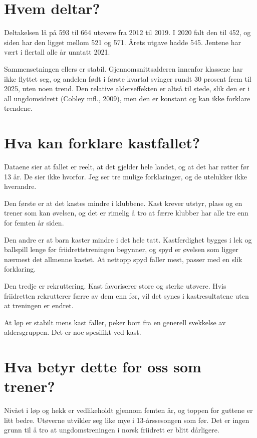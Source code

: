 \section{Hvem deltar?}\label{hvem-deltar}

Deltakelsen lå på 593 til 664 utøvere fra 2012 til 2019. I 2020 falt den til 452, og siden har den ligget mellom 521 og 571. Årets utgave hadde 545. Jentene har vært i flertall alle år unntatt 2021.

Sammensetningen ellers er stabil. Gjennomsnittsalderen innenfor klassene har ikke flyttet seg, og andelen født i første kvartal svinger rundt 30 prosent frem til 2025, uten noen trend. Den relative alderseffekten er altså til stede, slik den er i all ungdomsidrett (Cobley mfl., 2009), men den er konstant og kan ikke forklare trendene.

\section{Hva kan forklare kastfallet?}\label{hva-kan-forklare-kastfallet}

Dataene sier at fallet er reelt, at det gjelder hele landet, og at det har røtter før 13 år. De sier ikke hvorfor. Jeg ser tre mulige forklaringer, og de utelukker ikke hverandre.

Den første er at det kastes mindre i klubbene. Kast krever utstyr, plass og en trener som kan øvelsen, og det er rimelig å tro at færre klubber har alle tre enn for femten år siden.

Den andre er at barn kaster mindre i det hele tatt. Kastferdighet bygges i lek og ballspill lenge før friidrettstreningen begynner, og spyd er øvelsen som ligger nærmest det allmenne kastet. At nettopp spyd faller mest, passer med en slik forklaring.

Den tredje er rekruttering. Kast favoriserer store og sterke utøvere. Hvis friidretten rekrutterer færre av dem enn før, vil det synes i kastresultatene uten at treningen er endret.

At løp er stabilt mens kast faller, peker bort fra en generell svekkelse av aldersgruppen. Det er noe spesifikt ved kast.

\section{Hva betyr dette for oss som trener?}\label{hva-betyr-dette-for-oss-som-trener}

Nivået i løp og hekk er vedlikeholdt gjennom femten år, og toppen for guttene er litt bedre. Utøverne utvikler seg like mye i 13-årssesongen som før. Det er ingen grunn til å tro at ungdomstreningen i norsk friidrett er blitt dårligere.


